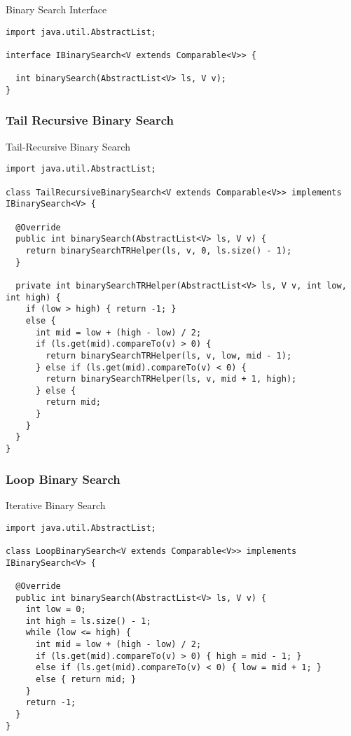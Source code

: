 \begin{cl}{Binary Search Interface}
\begin{lstlisting}[language=MyJava]
import java.util.AbstractList;

interface IBinarySearch<V extends Comparable<V>> {
  
  int binarySearch(AbstractList<V> ls, V v);
}
\end{lstlisting}
\end{cl}

\subsubsection*{Tail Recursive Binary Search}

\begin{cl}{Tail-Recursive Binary Search}
\begin{lstlisting}[language=MyJava]
import java.util.AbstractList;

class TailRecursiveBinarySearch<V extends Comparable<V>> implements IBinarySearch<V> {

  @Override
  public int binarySearch(AbstractList<V> ls, V v) {
    return binarySearchTRHelper(ls, v, 0, ls.size() - 1);
  }

  private int binarySearchTRHelper(AbstractList<V> ls, V v, int low, int high) {
    if (low > high) { return -1; }
    else {
      int mid = low + (high - low) / 2;
      if (ls.get(mid).compareTo(v) > 0) { 
        return binarySearchTRHelper(ls, v, low, mid - 1); 
      } else if (ls.get(mid).compareTo(v) < 0) { 
        return binarySearchTRHelper(ls, v, mid + 1, high); 
      } else { 
        return mid; 
      }
    }
  }
}
\end{lstlisting}
\end{cl}

\subsubsection*{Loop Binary Search}

\begin{cl}{Iterative Binary Search}
\begin{lstlisting}[language=MyJava]
import java.util.AbstractList;
  
class LoopBinarySearch<V extends Comparable<V>> implements IBinarySearch<V> {
  
  @Override
  public int binarySearch(AbstractList<V> ls, V v) {
    int low = 0;
    int high = ls.size() - 1;
    while (low <= high) {
      int mid = low + (high - low) / 2;
      if (ls.get(mid).compareTo(v) > 0) { high = mid - 1; } 
      else if (ls.get(mid).compareTo(v) < 0) { low = mid + 1; } 
      else { return mid; }
    }
    return -1;
  }
}
\end{lstlisting}
\end{cl}

